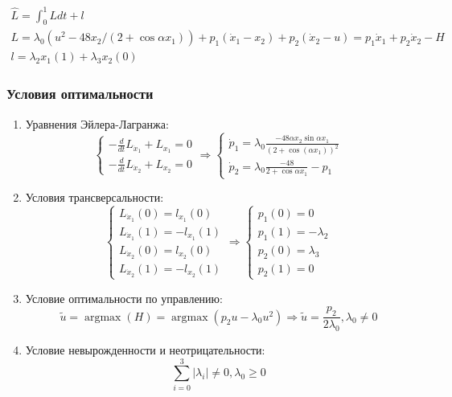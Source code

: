 \documentclass[a4paper,12pt]{article}
\DeclareMathOperator*{\argmax}{argmax}
\begin{document}
\begin{gather*}
  \hat{L}=\int_0^1L dt+l\\
  L=\lambda_0 \left(u^2-48x_2/\left(2+\cos{\alpha x_1}\right)\right) + p_1\left(\dot{x}_1-x_2\right)+p_2\left(\dot{x}_2-u\right)=p_1 \dot{x}_1+p_2 \dot{x}_2 - H\\
  l=\lambda_2 x_1(1)+\lambda_3 x_2(0)
\end{gather*}

\subsubsection*{Условия оптимальности}

\begin{enumerate}
\def\labelenumi{\arabic{enumi}.}
\item
  Уравнения
  Эйлера-Лагранжа:
  \begin{equation*}
    \begin{cases}
      -\frac{d}{dt}L_{\dot{x}_1}+L_{x_1}=0\\
      -\frac{d}{dt}L_{\dot{x}_2}+L_{x_2}=0
    \end{cases} \Rightarrow \begin{cases}
      \dot{p}_1=\lambda_0 \frac{-48\alpha x_2\sin{\alpha x_1}}{\left(2+\cos(\alpha x_1)\right)^2}\\
      \dot{p}_2=\lambda_0\frac{-48}{2+\cos{\alpha x_1}}-p_1
    \end{cases}
  \end{equation*}
\item
  Условия трансверсальности:
  \begin{equation*}
    \begin{cases}
      L_{\dot{x}_1}(0)=l_{x_1}(0)\\
      L_{\dot{x}_1}(1)=-l_{x_1}(1)\\
      L_{\dot{x}_2}(0)=l_{x_2}(0)\\
      L_{\dot{x}_2}(1)=-l_{x_2}(1)
    \end{cases} \Rightarrow \begin{cases}
      p_1(0)=0\\
      p_1(1)=-\lambda_2\\
      p_2(0)=\lambda_3\\
      p_2(1)=0
    \end{cases}
  \end{equation*}
\item
  Условие оптимальности по управлению:
  \begin{equation*}
    \tilde{u}=\argmax(H)=\argmax\left(p_2u-\lambda_0 u^2\right) \Rightarrow \tilde{u}=\frac{p_2}{2\lambda_0}, \lambda_0 \neq 0
  \end{equation*}
\item
  Условие невырожденности и неотрицательности:
  \begin{equation*}
    \sum_{i=0}^{3} |\lambda_i| \neq 0, \lambda_0 \ge 0
  \end{equation*}
\end{enumerate}
\end{document}
